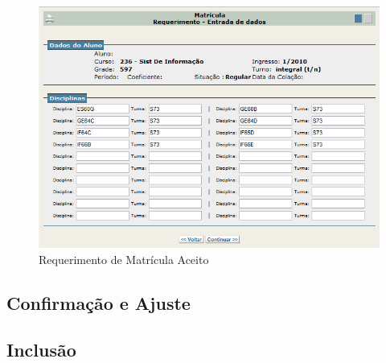 \documentclass[a4paper,12pt,openany]{article}
\begin{document}
	\begin{figure}[ht!]  \centering
		\includegraphics[scale=0.5]{Matricula_Requerimento_Preenchido.png}
		\caption{Requerimento de Matrícula Aceito}
		\label{matriculaRequerimentoAceito}
	\end{figure}


\subsection{Confirmação e Ajuste}


\subsection{Inclusão}
\end{document}
